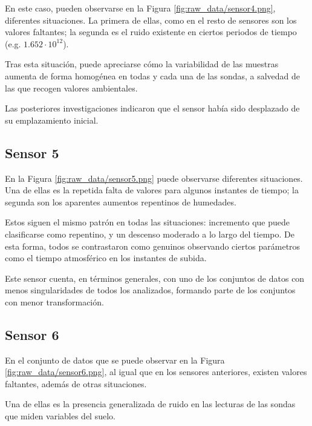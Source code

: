 
En este caso, pueden observarse en la Figura \ref{fig:raw_data/sensor4.png}, diferentes
situaciones. La primera de ellas, como en el resto de sensores son los valores faltantes; la
segunda es el ruido existente en ciertos periodos de tiempo (e.g. \(1.652 \cdot 10^{12}\)).

Tras esta situación, puede apreciarse cómo la variabilidad de las muestras
aumenta de forma homogénea en todas y cada una de las sondas, a salvedad de las que recogen
valores ambientales.

Las posteriores investigaciones indicaron que el sensor había sido desplazado
de su emplazamiento inicial.

\newpage
\subsection{Sensor 5}


En la Figura \ref{fig:raw_data/sensor5.png} puede observarse diferentes situaciones.
Una de ellas es la repetida falta de valores para algunos instantes de tiempo; la 
segunda son los aparentes aumentos repentinos de humedades.

Estos siguen el mismo patrón en todas las situaciones: incremento que puede clasificarse
como repentino, y un descenso moderado a lo largo del tiempo.
De esta forma, todos se contrastaron como genuinos observando ciertos parámetros como
el tiempo atmosférico en los instantes de subida.

Este sensor cuenta, en términos generales, con uno de los conjuntos de datos con menos singularidades
de todos los analizados, formando parte de los conjuntos con menor transformación.

\newpage
\subsection{Sensor 6}


En el conjunto de datos que se puede observar en la Figura \ref{fig:raw_data/sensor6.png},
al igual que en los sensores anteriores, existen valores faltantes, además de 
otras situaciones.

Una de ellas es la presencia generalizada de ruido en las lecturas  de las sondas que miden 
variables del suelo.

